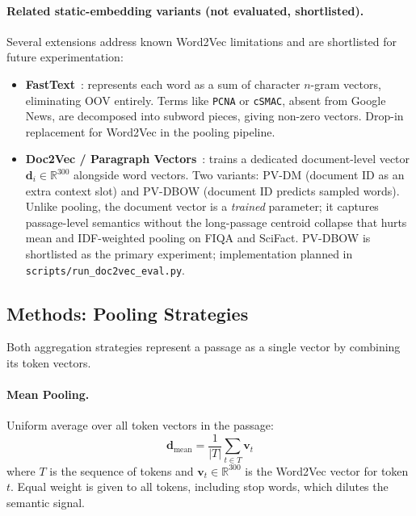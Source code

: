 \documentclass[12pt, a4paper]{article}
\newcommand{\bvec}[1]{\mathbf{#1}}
\begin{document}
\paragraph{Related static-embedding variants (not evaluated, shortlisted).}
Several extensions address known Word2Vec limitations and are shortlisted for
future experimentation:
\begin{itemize}
  \item \textbf{FastText}~\citep{bojanowski2017enriching}: represents each word
        as a sum of character $n$-gram vectors, eliminating OOV entirely.
        Terms like \texttt{PCNA} or \texttt{cSMAC}, absent from Google News,
        are decomposed into subword pieces, giving non-zero vectors.
        Drop-in replacement for Word2Vec in the pooling pipeline.
  \item \textbf{Doc2Vec / Paragraph Vectors}~\citep{le2014distributed}: trains
        a dedicated document-level vector $\bvec{d}_i \in \mathbb{R}^{300}$
        alongside word vectors.  Two variants: PV-DM (document ID as an extra
        context slot) and PV-DBOW (document ID predicts sampled words).
        Unlike pooling, the document vector is a \emph{trained} parameter;
        it captures passage-level semantics without the long-passage centroid
        collapse that hurts mean and IDF-weighted pooling on FIQA and SciFact.
        PV-DBOW is shortlisted as the primary experiment; implementation
        planned in \texttt{scripts/run\_doc2vec\_eval.py}.
\end{itemize}

\subsection{Methods: Pooling Strategies}

Both aggregation strategies represent a passage as a single vector by
combining its token vectors.

\paragraph{Mean Pooling.}
Uniform average over all token vectors in the passage:
\begin{equation}
  \bvec{d}_{\text{mean}} = \frac{1}{|T|} \sum_{t \in T} \bvec{v}_t
  \label{eq:mean_pool}
\end{equation}
where $T$ is the sequence of tokens and $\bvec{v}_t \in \mathbb{R}^{300}$
is the Word2Vec vector for token $t$.  Equal weight is given to all tokens,
including stop words, which dilutes the semantic signal.
\end{document}
